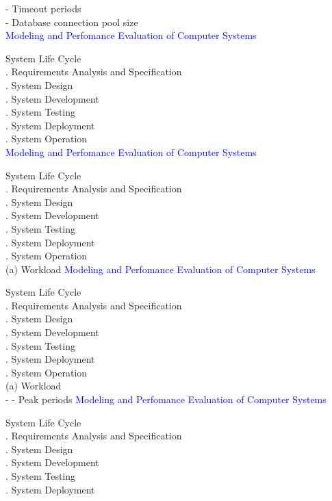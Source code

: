 \documentclass[svgnames]{beamer}
\begin{document}
 - Timeout periods \\
 - Database connection pool size\\
\newpage
\textcolor{blue}{Modeling and Perfomance Evaluation of Computer Systems} \\[38pt]
\raggedright
\! System Life Cycle\\
. Requirements Analysis and Specification\\
. System Design\\
. System Development\\
. System Testing\\
. System Deployment\\
. System Operation\\[8pt] 
\newpage
\textcolor{blue}{Modeling and Perfomance Evaluation of Computer Systems} \\[38pt]
\raggedright
\! System Life Cycle\\
. Requirements Analysis and Specification\\
. System Design\\
. System Development\\
. System Testing\\
. System Deployment\\
. System Operation\\[8pt] 
(a) Workload
\newpage
\textcolor{blue}{Modeling and Perfomance Evaluation of Computer Systems} \\[38pt]
\raggedright
\! System Life Cycle\\
. Requirements Analysis and Specification\\
. System Design\\
. System Development\\
. System Testing\\
. System Deployment\\
. System Operation\\[8pt] 
 (a) Workload\\
\quad - - \quad Peak periods
\newpage
\textcolor{blue}{Modeling and Perfomance Evaluation of Computer Systems} \\[38pt]
\raggedright
\! System Life Cycle\\
. Requirements Analysis and Specification\\
. System Design\\
. System Development\\
. System Testing\\
. System Deployment\\
\end{document}
